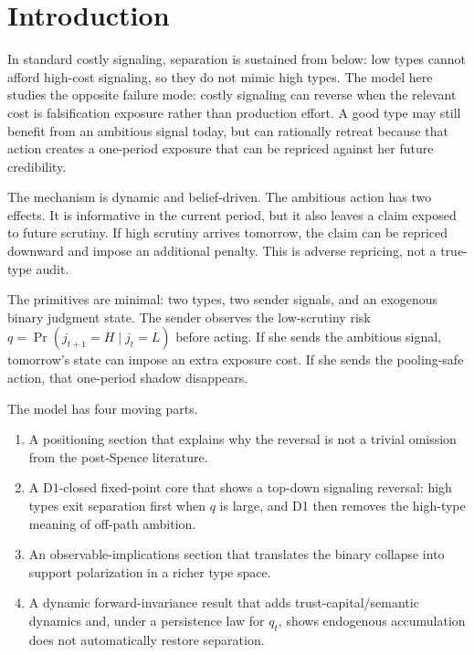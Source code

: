 
\section{Introduction}
\label{sec:introduction}

In standard costly signaling, separation is sustained from below: low types cannot afford high-cost signaling, so they do not mimic high types. The model here studies the opposite failure mode: costly signaling can reverse when the relevant cost is falsification exposure rather than production effort. A good type may still benefit from an ambitious signal today, but can rationally retreat because that action creates a one-period exposure that can be repriced against her future credibility.

The mechanism is dynamic and belief-driven. The ambitious action has two effects. It is informative in the current period, but it also leaves a claim exposed to future scrutiny. If high scrutiny arrives tomorrow, the claim can be repriced downward and impose an additional penalty. This is adverse repricing, not a true-type audit.

The primitives are minimal: two types, two sender signals, and an exogenous binary judgment state. The sender observes the low-scrutiny risk $q=\Pr(j_{t+1}=H\mid j_t=L)$ before acting. If she sends the ambitious signal, tomorrow's state can impose an extra exposure cost. If she sends the pooling-safe action, that one-period shadow disappears.

The model has four moving parts.
\begin{enumerate}
\item A positioning section that explains why the reversal is not a trivial omission from the post-Spence literature.
\item A D1-closed fixed-point core that shows a top-down signaling reversal: high types exit separation first when $q$ is large, and D1 then removes the high-type meaning of off-path ambition.
\item An observable-implications section that translates the binary collapse into support polarization in a richer type space.
\item A dynamic forward-invariance result that adds trust-capital/semantic dynamics and, under a persistence law for $q_t$, shows endogenous accumulation does not automatically restore separation.
\end{enumerate}

